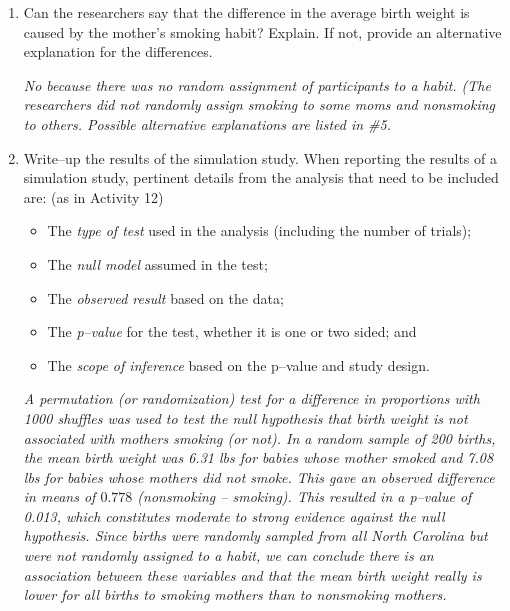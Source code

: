 \begin{enumerate}
\begin{key}
  {\it  Yes because this is a random sample of all NC births, no
    because we didn't look at other states.}
\end{key}


\item Can the researchers say that the difference in the average
  birth weight is caused by the mother's smoking habit?  Explain. If
  not, provide an alternative   explanation for the differences. 
\begin{students}
 \vspace{2cm}
\end{students}

\begin{key}
  {\it   No because there was no random assignment of participants to
    a habit.  (The researchers did not randomly assign smoking to some
    moms and nonsmoking to others. Possible alternative explanations
    are listed in \#5.} 
\end{key}


\item  Write--up the results of the simulation study. When reporting
  the results of a simulation study, pertinent details from the
  analysis that need to be included are: (as in Activity 12)
  \begin{itemize}
  \item The {\it type of test} used in the analysis (including the number of trials);
  \item The {\it null model} assumed in the test;
  \item The {\it observed result} based on the data;
  \item The {\it p--value} for the test, whether it is one or two sided; and
  \item The {\it scope of inference} based on the p--value and study design.
  \end{itemize}
\begin{students}
\newpage
\end{students}
\begin{key}
  {\it A permutation (or randomization) test for a difference in
    proportions with 1000 shuffles was used to test the null
    hypothesis that birth weight is not associated with mothers
    smoking (or not).  In a random sample of 200 births, the mean
    birth weight was 6.31 lbs for babies whose mother smoked and 7.08
    lbs for babies whose mothers did not smoke. This gave an observed
    difference in means of $0.778$ (nonsmoking -- smoking).  This
    resulted in a p--value of 0.013, which constitutes moderate to
    strong evidence against the null hypothesis.  Since births were
    randomly sampled from all North Carolina but were not randomly
    assigned to a habit, we can conclude there is an association
    between these variables and that the mean birth weight really is
    lower for all births to smoking mothers than to nonsmoking
    mothers. }
\end{key}
\ 
\vspace*{\fill}


\end{enumerate}
